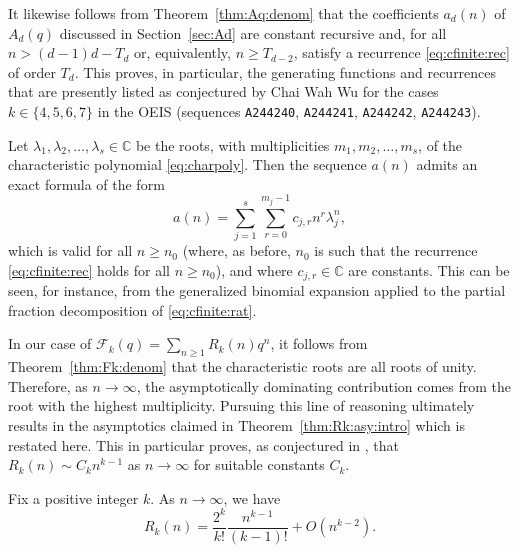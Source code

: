 \documentclass[11pt]{article}
\theoremstyle{plain}
\theoremstyle{definition}
\newcommand{\rightarrowlim}{\mathop{\rightarrow}\limits}
\newcommand{\tmtt}[1]{\texttt{#1}}
\begin{document}
\begin{example}
  It likewise follows from Theorem~\ref{thm:Aq:denom} that the coefficients
  $a_d (n)$ of $A_d (q)$ discussed in Section~\ref{sec:Ad} are constant
  recursive and, for all $n > (d - 1) d - T_d$ or, equivalently, $n \geq
  T_{d - 2}$, satisfy a recurrence \eqref{eq:cfinite:rec} of order $T_d$. This
  proves, in particular, the generating functions and recurrences that are
  presently listed as conjectured by Chai Wah Wu for the cases $k \in \{ 4, 5,
  6, 7 \}$ in the OEIS \cite{sloane-oeis} (sequences \texttt{A244240},
  {\tmtt{A244241}}, {\tmtt{A244242}}, {\tmtt{A244243}}).
\end{example}

Let $\lambda_1, \lambda_2, \ldots, \lambda_s \in \mathbb{C}$ be the roots,
with multiplicities $m_1, m_2, \ldots, m_s$, of the characteristic polynomial
\eqref{eq:charpoly}. Then the sequence $a (n)$ admits an exact formula of the
form
\begin{equation}
  a (n) = \sum_{j = 1}^s \sum_{r = 0}^{m_j - 1} c_{j, r} n^r \lambda_j^n,
  \label{eq:cfinite:exact}
\end{equation}
which is valid for all $n \geq n_0$ (where, as before, $n_0$ is such that
the recurrence \eqref{eq:cfinite:rec} holds for all $n \geq n_0$), and
where $c_{j, r} \in \mathbb{C}$ are constants. This can be seen, for instance,
from the generalized binomial expansion applied to the partial fraction
decomposition of \eqref{eq:cfinite:rat}.

In our case of $\mathcal{F}_k (q) = \sum_{n \geq 1} R_k (n) q^n$, it
follows from Theorem~\ref{thm:Fk:denom} that the characteristic roots are all
roots of unity. Therefore, as $n \rightarrow \infty$, the asymptotically
dominating contribution comes from the root with the highest multiplicity.
Pursuing this line of reasoning ultimately results in the asymptotics claimed
in Theorem~\ref{thm:Rk:asy:intro} which is restated here. This in particular
proves, as conjectured in \cite{sharan-rook}, that $R_k (n) \sim C_k n^{k -
1}$ as $n \rightarrow \infty$ for suitable constants $C_k$.

\begin{theorem}
  \label{thm:Rk:asy}Fix a positive integer $k$. As $n \rightarrowlim \infty$,
  we have
  \begin{equation}
    R_k (n) = \frac{2^k}{k!} \frac{n^{k - 1}}{(k - 1) !} + O (n^{k - 2}) .
    \label{eq:Rk:asy:first}
  \end{equation}
\end{theorem}
\end{document}
